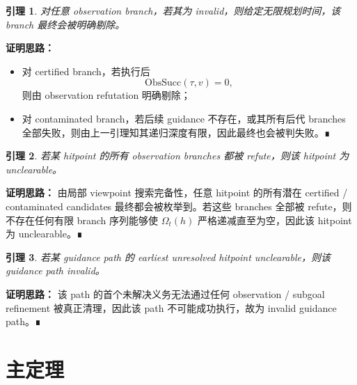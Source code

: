 \documentclass[11pt]{ctexart}
\newtheorem{lemma}{引理}
\begin{document}
\begin{lemma}
对任意 observation branch，若其为 invalid，则给定无限规划时间，该 branch 最终会被明确剔除。
\end{lemma}

\noindent\textbf{证明思路：}
\begin{itemize}[leftmargin=2em]
    \item 对 certified branch，若执行后
    \[
    \mathrm{ObsSucc}(\tau,v)=0,
    \]
    则由 observation refutation 明确剔除；
    \item 对 contaminated branch，若后续 guidance 不存在，或其所有后代 branches 全部失败，则由上一引理知其递归深度有限，因此最终也会被判失败。∎
\end{itemize}

\begin{lemma}
若某 hitpoint 的所有 observation branches 都被 refute，则该 hitpoint 为 unclearable。
\end{lemma}

\noindent\textbf{证明思路：}
由局部 viewpoint 搜索完备性，任意 hitpoint 的所有潜在 certified / contaminated candidates 最终都会被枚举到。若这些 branches 全部被 refute，则不存在任何有限 branch 序列能够使 $\Omega_t(h)$ 严格递减直至为空，因此该 hitpoint 为 unclearable。∎

\begin{lemma}
若某 guidance path 的 earliest unresolved hitpoint unclearable，则该 guidance path invalid。
\end{lemma}

\noindent\textbf{证明思路：}
该 path 的首个未解决义务无法通过任何 observation / subgoal refinement 被真正清理，因此该 path 不可能成功执行，故为 invalid guidance path。∎

\section{主定理}
\end{document}
